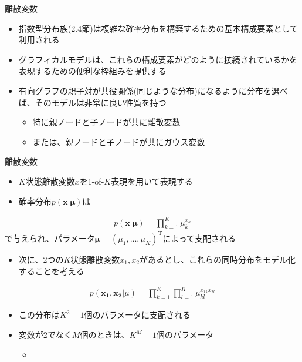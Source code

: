 \begin{frame}{離散変数}
 \begin{itemize}
  \item 指数型分布族(2.4節)は複雑な確率分布を構築するための基本構成要素として利用される
  \item グラフィカルモデルは、これらの構成要素がどのように接続されているかを表現するための便利な枠組みを提供する
  \item 有向グラフの親子対が共役関係(同じような分布)になるように分布を選べば、そのモデルは非常に良い性質を持つ
        \begin{itemize}
         \item 特に親ノードと子ノードが共に\alert{離散変数}
         \item または、親ノードと子ノードが共に\alert{ガウス変数}
        \end{itemize}
 \end{itemize}
\end{frame}

\begin{frame}{離散変数}
 \begin{itemize}
  \item $K$状態離散変数$x$を1-of-$K$表現を用いて表現する
  \item 確率分布$p(\bm{x}|\bm{\mu})$は
 \end{itemize}
 \begin{eqnarray*}
  p(\bm{x}|\bm{\mu}) = \prod_{k=1}^{K}\mu_k^{x_k}
 \end{eqnarray*}
 で与えられ、パラメータ$\bm{\mu}=(\mu_1,...,\mu_K)^{\mathrm{T}}$によって支配される
 \begin{itemize}
  \item 次に、2つの$K$状態離散変数$x_1,x_2$があるとし、これらの同時分布をモデル化することを考える
 \end{itemize}
 \begin{eqnarray*}
  p(\bm{x_1},\bm{x_2}|\mu) = \prod_{k=1}^{K}\prod_{l=1}^{K}\mu_{kl}^{x_{1k}x_{2l}}
 \end{eqnarray*}
 \begin{itemize}
  \item この分布は$K^2-1$個のパラメータに支配される
  \item 変数が2でなく$M$個のときは、$K^M-1$個のパラメータ
        \begin{itemize}
         \item {}
        \end{itemize}
 \end{itemize}
\end{frame}

